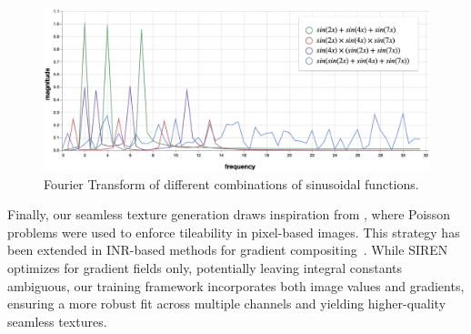 
\begin{figure}[h]
\centering
\includegraphics[width=0.80\linewidth]{img/ch6/generated_frequencies.png}
\caption{Fourier Transform of different combinations of sinusoidal functions.}
\label{f:generated-frequencies}
\end{figure}
    

Finally, our seamless texture generation draws inspiration from \citet{perez2003}, where Poisson problems were used to enforce tileability in pixel-based images. This strategy has been extended in INR-based methods for gradient compositing~\citep{sitzmann2019siren, schardong2024neural}. While SIREN optimizes for gradient fields only, potentially leaving integral constants ambiguous, our training framework incorporates both image values and gradients, ensuring a more robust fit across multiple channels and yielding higher-quality seamless textures.


